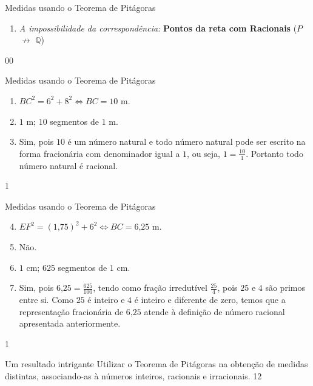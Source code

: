 \begin{sugestions}{Medidas usando o Teorema de Pitágoras}
{\begin{enumerate}[label=\titem{\arabic*)}]
Note que \(med(OB) = \frac{7}{2} med(OA)\).

Esta operação pode efetuar-se sempre, qualquer que seja os valores dos inteiros \(m\) e \(n\) (\(n \neq 0\)), e o ponto \(B\) é único, portanto a correspondência \(\mathbb{Q}\) \(\to\) \(P\) é \textbf{completa e unívoca}.

\item \textit{A impossibilidade da correspondência:} \textbf{Pontos da reta com Racionais} (\(P\) \(\not \to\) \(\mathbb{Q}\))
\end{enumerate}
}{0}{0}
\end{sugestions}

\begin{answer}{Medidas usando o Teorema de Pitágoras}
{
\begin{enumerate}
\item \(BC^2 = 6^2 + 8^2 \Leftrightarrow BC=10\) m.

\item {} 
\(1\) m; \(10\) segmentos de \(1\) m.

\item {} 
Sim, pois \(10\) é um número natural e todo número natural pode ser escrito na forma fracionária com denominador igual a \(1\), ou seja, \(1 = \frac{10}{1}\). Portanto todo número natural é racional.
\end{enumerate}
}{1}
\end{answer}
\clearmargin
\begin{answer}{Medidas usando o Teorema de Pitágoras}
{
\begin{enumerate}\setcounter{enumi}{3}
\item {} 
\(EF^2 = (1\text{,}75)^2 + 6^2 \Leftrightarrow BC=6\text{,}25\) m.

\item Não.

\item {} 
\(1\) cm; \(625\) segmentos de \(1\) cm.

\item {} 
Sim, pois \(6\text{,}25 = \frac{625}{100}\),  tendo como fração irredutível  \(\frac{25}{4}\), pois \(25\) e \(4\) são primos entre si. Como \(25\) é inteiro e \(4\) é inteiro e diferente de zero, temos que a representação fracionária de \(6\text{,}25\) atende à definição de número racional apresentada anteriormente.
\end{enumerate}
}{1}
\end{answer}
\begin{objectives}{Um resultado intrigante}
{
Utilizar o Teorema de Pitágoras na obtenção de medidas distintas, associando-as à números inteiros, racionais e irracionais.
}{1}{2}
\end{objectives}
